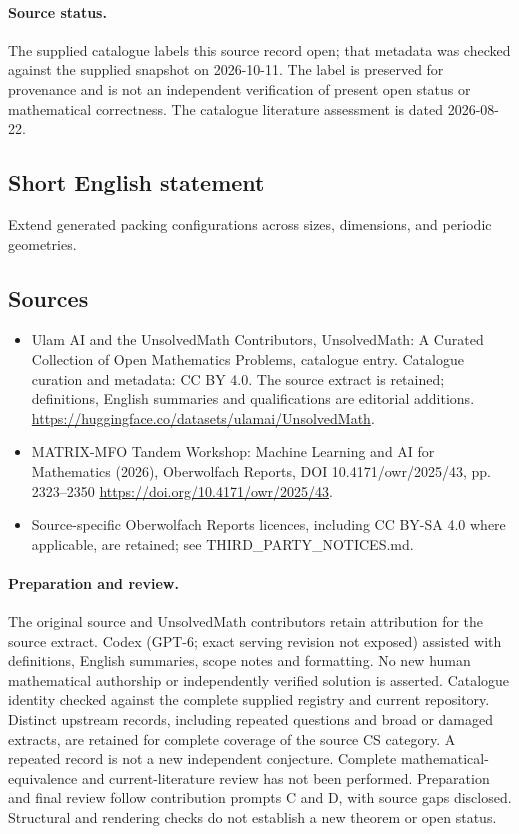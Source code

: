 \documentclass[11pt]{article}
\begin{document}
\paragraph{Source status.}
The supplied catalogue labels this source record open; that metadata was checked against the supplied snapshot on 2026-10-11. The label is preserved for provenance and is not an independent verification of present open status or mathematical correctness. The catalogue literature assessment is dated 2026-08-22.
\subsection{Short English statement}
Extend generated packing configurations across sizes, dimensions, and periodic geometries.
\subsection{Sources}
\begin{itemize}
\item[S1] Ulam AI and the UnsolvedMath Contributors, UnsolvedMath: A Curated Collection of Open Mathematics Problems, catalogue entry. Catalogue curation and metadata: CC BY 4.0. The source extract is retained; definitions, English summaries and qualifications are editorial additions.
\url{https://huggingface.co/datasets/ulamai/UnsolvedMath}.
\item[S2] MATRIX-MFO Tandem Workshop: Machine Learning and AI for Mathematics (2026), Oberwolfach Reports, DOI 10.4171/owr/2025/43, pp. 2323--2350
\url{https://doi.org/10.4171/owr/2025/43}.
\item Source-specific Oberwolfach Reports licences, including CC BY-SA 4.0 where applicable, are retained; see THIRD\_PARTY\_NOTICES.md.
\end{itemize}
\paragraph{Preparation and review.}
The original source and UnsolvedMath contributors retain attribution for the source extract. Codex (GPT-6; exact serving revision not exposed) assisted with definitions, English summaries, scope notes and formatting. No new human mathematical authorship or independently verified solution is asserted. Catalogue identity checked against the complete supplied registry and current repository. Distinct upstream records, including repeated questions and broad or damaged extracts, are retained for complete coverage of the source CS category. A repeated record is not a new independent conjecture. Complete mathematical-equivalence and current-literature review has not been performed. Preparation and final review follow contribution prompts C and D, with source gaps disclosed. Structural and rendering checks do not establish a new theorem or open status.
\label{end:statement}
\end{document}
